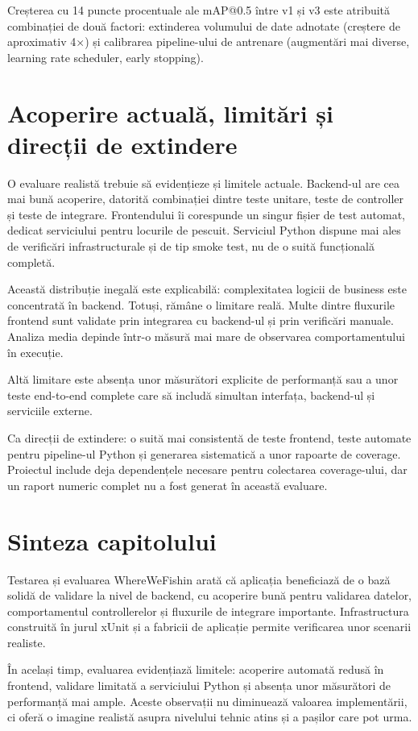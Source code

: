Creșterea cu 14 puncte procentuale ale mAP@0.5 între v1 și v3 este atribuită combinației de două factori: extinderea volumului de date adnotate (creștere de aproximativ 4$\times$) și calibrarea pipeline-ului de antrenare (augmentări mai diverse, learning rate scheduler, early stopping).

\section{Acoperire actuală, limitări și direcții de extindere}

O evaluare realistă trebuie să evidențieze și limitele actuale. Backend-ul are cea mai bună acoperire, datorită combinației dintre teste unitare, teste de controller și teste de integrare. Frontendului îi corespunde un singur fișier de test automat, dedicat serviciului pentru locurile de pescuit. Serviciul Python dispune mai ales de verificări infrastructurale și de tip smoke test, nu de o suită funcțională completă.

Această distribuție inegală este explicabilă: complexitatea logicii de business este concentrată în backend. Totuși, rămâne o limitare reală. Multe dintre fluxurile frontend sunt validate prin integrarea cu backend-ul și prin verificări manuale. Analiza media depinde într-o măsură mai mare de observarea comportamentului în execuție.

Altă limitare este absența unor măsurători explicite de performanță sau a unor teste end-to-end complete care să includă simultan interfața, backend-ul și serviciile externe.

Ca direcții de extindere: o suită mai consistentă de teste frontend, teste automate pentru pipeline-ul Python și generarea sistematică a unor rapoarte de coverage. Proiectul include deja dependențele necesare pentru colectarea coverage-ului, dar un raport numeric complet nu a fost generat în această evaluare.

\section{Sinteza capitolului}

Testarea și evaluarea WhereWeFishin arată că aplicația beneficiază de o bază solidă de validare la nivel de backend, cu acoperire bună pentru validarea datelor, comportamentul controllerelor și fluxurile de integrare importante. Infrastructura construită în jurul xUnit și a fabricii de aplicație permite verificarea unor scenarii realiste.

În același timp, evaluarea evidențiază limitele: acoperire automată redusă în frontend, validare limitată a serviciului Python și absența unor măsurători de performanță mai ample. Aceste observații nu diminuează valoarea implementării, ci oferă o imagine realistă asupra nivelului tehnic atins și a pașilor care pot urma.

